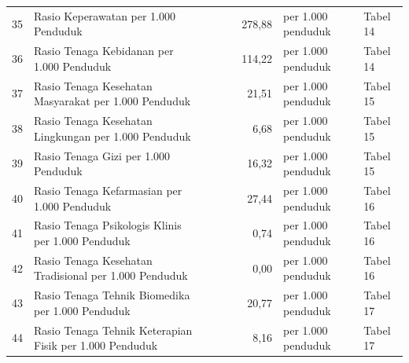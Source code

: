 \begin{small}
\begin{longtable}{rY{12em}rrrrY{5em}Y{5em}}
	                   35 & Rasio Keperawatan per 1.000 Penduduk                                                                    &        &        &         &             278,88 & per 1.000 penduduk             & Tabel 14 \\
	 36 & Rasio Tenaga Kebidanan per 1.000 Penduduk                                                               &        &        &         &             114,22 & per 1.000 penduduk             & Tabel 14 \\
	                   37 & Rasio Tenaga Kesehatan Masyarakat per 1.000 Penduduk                                                    &        &        &         &              21,51 & per 1.000 penduduk             & Tabel 15 \\
	 38 & Rasio Tenaga Kesehatan Lingkungan per 1.000 Penduduk                                                    &        &        &         &               6,68 & per 1.000 penduduk             & Tabel 15 \\
	                   39 & Rasio Tenaga Gizi per 1.000 Penduduk                                                                    &        &        &         &              16,32 & per 1.000 penduduk             & Tabel 15 \\
	 40 & Rasio Tenaga Kefarmasian per 1.000 Penduduk                                                             &        &        &         &              27,44 & per 1.000 penduduk             & Tabel 16 \\
	                   41 & Rasio Tenaga Psikologis Klinis per 1.000 Penduduk                                                       &        &        &         &               0,74 & per 1.000 penduduk             & Tabel 16 \\
	 42 & Rasio Tenaga Kesehatan Tradisional per 1.000 Penduduk                                                   &        &        &         &               0,00 & per 1.000 penduduk             & Tabel 16 \\
	                   43 & Rasio Tenaga Tehnik Biomedika per 1.000 Penduduk                                                        &        &        &         &              20,77 & per 1.000 penduduk             & Tabel 17 \\
	 44 & Rasio Tenaga Tehnik Keterapian Fisik per 1.000 Penduduk                                                 &        &        &         &               8,16 & per 1.000 penduduk             & Tabel 17 \\

\end{longtable}
\end{small}
